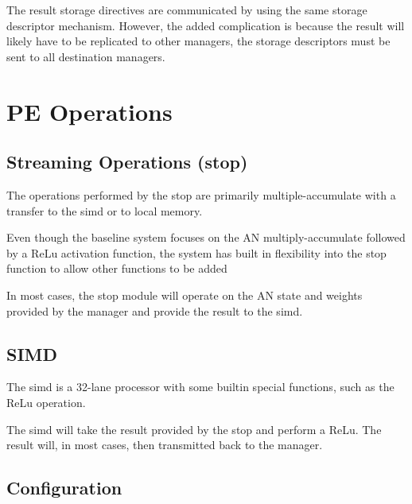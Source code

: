 The result storage directives are communicated by using the same storage descriptor mechanism. However, the added complication is because the result will likely have to be replicated to other managers, the storage descriptors must be sent to all destination managers.


\section{PE Operations}
\label{sec:PE Operations}

\subsection{Streaming Operations (\ac{stop})}
\label{ssec:streamingOps}
The operations performed by the \ac{stop} are primarily multiple-accumulate with a transfer to the \ac{simd} or to local memory.

Even though the baseline system focuses on the AN multiply-accumulate followed by a ReLu activation function, the system has built in flexibility into the \ac{stop} function to allow other functions to be added

In most cases, the \ac{stop} module will operate on the AN state and weights provided by the manager and provide the result to the \ac{simd}.
\subsection{SIMD}
\label{ssec:SIMD}

The \ac{simd} is a 32-lane processor with some builtin special functions, such as the ReLu operation.

The \ac{simd} will take the result provided by the \ac{stop} and perform a ReLu. The result will, in most cases, then transmitted back to the manager.

\subsection{Configuration}
\label{ssec:peConfiguration}

